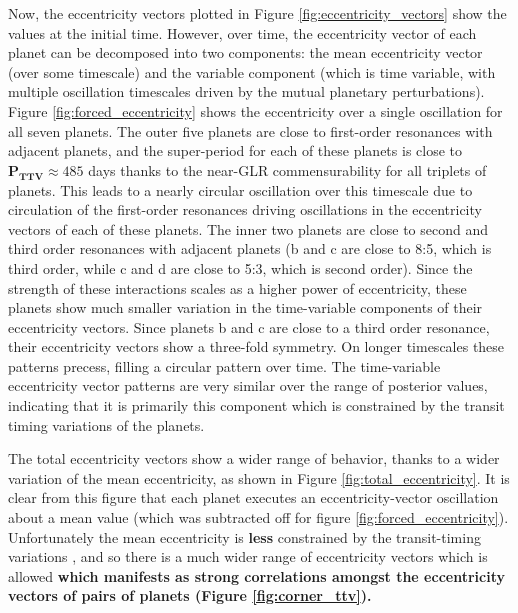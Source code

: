 \documentclass[twocolumn]{aastex63}
\begin{document}
Now, the eccentricity vectors plotted in Figure \ref{fig:eccentricity_vectors} show the
values at the initial time. However, over time, the eccentricity vector of each planet can be decomposed into two components: the mean eccentricity vector (over some timescale) and the variable component (which is time variable, with multiple oscillation timescales driven by the mutual planetary perturbations).   Figure \ref{fig:forced_eccentricity}
shows the eccentricity over a single oscillation for all seven planets.  The outer five
planets are close to first-order resonances with adjacent planets, and the super-period
for each of these planets is close to $\mathbf{P_{TTV}{\approx}}485$ days thanks to the near-GLR commensurability
for all triplets of planets.  This leads to a nearly circular oscillation over this timescale
due to circulation of the first-order resonances driving oscillations in the eccentricity
vectors of each of these planets.  The inner two planets are close to second and third
order resonances with adjacent planets (b and c are close to 8:5, which is third order,
while c and d are close to 5:3, which is second order).  Since the strength of these
interactions scales as a higher power of eccentricity, these planets show much smaller variation
in the time-variable components of their eccentricity vectors.  Since planets b and c are
close to a third order resonance,
their eccentricity vectors show a three-fold symmetry.  On longer timescales these patterns
precess, filling a circular pattern over time.  The time-variable eccentricity vector patterns are
very similar over the range of posterior values, indicating that it is primarily this
component which is constrained by the transit timing variations of the planets.

The total eccentricity vectors show a wider range of behavior, thanks to a wider variation
of the mean eccentricity, as shown in Figure \ref{fig:total_eccentricity}.  It is clear
from this figure that each planet executes an eccentricity-vector oscillation about a
mean value (which was subtracted off for figure \ref{fig:forced_eccentricity}).  Unfortunately the mean eccentricity is \textbf{less} constrained by the transit-timing
variations \textbf{\citep{Linial2018}}, and so there is a much wider range of eccentricity vectors which is allowed
\textbf{which manifests as strong correlations amongst the eccentricity vectors of pairs of
planets (Figure \ref{fig:corner_ttv}).}
\end{document}
